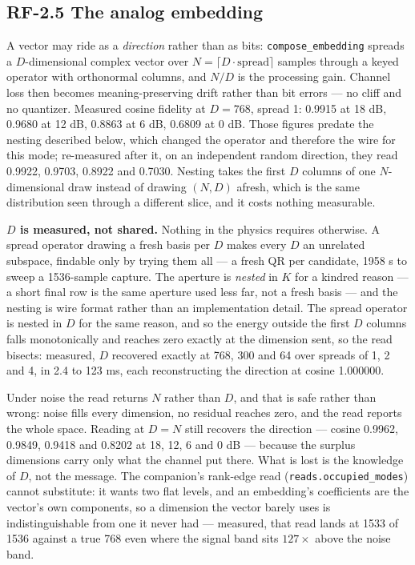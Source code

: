 \documentclass[10pt,letterpaper,twocolumn]{article}
\begin{document}
\subsection{RF-2.5 The analog embedding}\label{rf-25-the-analog-embedding}

A vector may ride as a \emph{direction} rather than as bits: \texttt{compose\_\allowbreak{}embedding} spreads a \(D\)-dimensional complex vector over \(N = \lceil D\cdot\text{spread}\rceil\) samples through a keyed operator with orthonormal columns, and \(N/D\) is the processing gain. Channel loss then becomes meaning-preserving drift rather than bit errors --- no cliff and no quantizer. Measured cosine fidelity at \(D=768\), spread 1: 0.9915 at 18 dB, 0.9680 at 12 dB, 0.8863 at 6 dB, 0.6809 at 0 dB. Those figures predate the nesting described below, which changed the operator and therefore the wire for this mode; re-measured after it, on an independent random direction, they read 0.9922, 0.9703, 0.8922 and 0.7030. Nesting takes the first \(D\) columns of one \(N\)-dimensional draw instead of drawing \((N, D)\) afresh, which is the same distribution seen through a different slice, and it costs nothing measurable.

\textbf{\(D\) is measured, not shared.} Nothing in the physics requires otherwise. A spread operator drawing a fresh basis per \(D\) makes every \(D\) an unrelated subspace, findable only by trying them all --- a fresh QR per candidate, 1958 s to sweep a 1536-sample capture. The aperture is \emph{nested} in \(K\) for a kindred reason --- a short final row is the same aperture used less far, not a fresh basis --- and the nesting is wire format rather than an implementation detail. The spread operator is nested in \(D\) for the same reason, and so the energy outside the first \(D\) columns falls monotonically and reaches zero exactly at the dimension sent, so the read bisects: measured, \(D\) recovered exactly at 768, 300 and 64 over spreads of 1, 2 and 4, in 2.4 to 123 ms, each reconstructing the direction at cosine 1.000000.

Under noise the read returns \(N\) rather than \(D\), and that is safe rather than wrong: noise fills every dimension, no residual reaches zero, and the read reports the whole space. Reading at \(D = N\) still recovers the direction --- cosine 0.9962, 0.9849, 0.9418 and 0.8202 at 18, 12, 6 and 0 dB --- because the surplus dimensions carry only what the channel put there. What is lost is the knowledge of \(D\), not the message. The companion's rank-edge read (\texttt{reads.\allowbreak{}occupied\_\allowbreak{}modes}) cannot substitute: it wants two flat levels, and an embedding's coefficients are the vector's own components, so a dimension the vector barely uses is indistinguishable from one it never had --- measured, that read lands at 1533 of 1536 against a true 768 even where the signal band sits \(127\times\) above the noise band.
\end{document}
